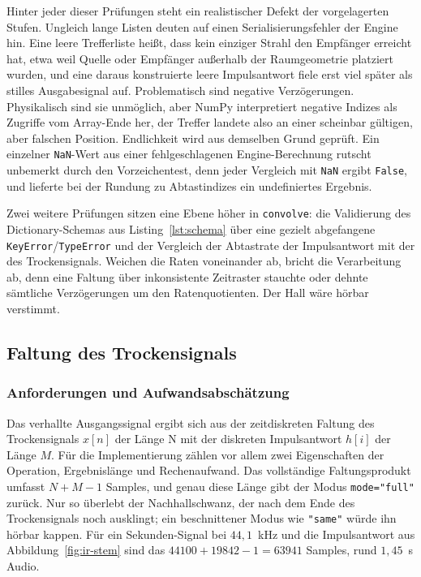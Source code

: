 Hinter jeder dieser Prüfungen steht ein realistischer Defekt der vorgelagerten
Stufen. Ungleich lange Listen deuten auf einen Serialisierungsfehler der Engine
hin. Eine leere Trefferliste heißt, dass kein einziger Strahl den Empfänger
erreicht hat, etwa weil Quelle oder Empfänger außerhalb der Raumgeometrie
platziert wurden, und eine daraus konstruierte leere Impulsantwort fiele erst
viel später als stilles Ausgabesignal auf. Problematisch sind negative Verzögerungen.
Physikalisch sind sie unmöglich, aber NumPy interpretiert negative Indizes
als Zugriffe vom Array-Ende her, der Treffer landete also an einer
scheinbar gültigen, aber falschen Position.
Endlichkeit wird aus demselben Grund geprüft.
Ein einzelner \texttt{NaN}-Wert aus einer fehlgeschlagenen Engine-Berechnung
rutscht unbemerkt durch den Vorzeichentest, denn jeder Vergleich mit
\texttt{NaN} ergibt \texttt{False}, und lieferte bei der Rundung zu
Abtastindizes ein undefiniertes Ergebnis.

Zwei weitere Prüfungen sitzen eine Ebene höher in \texttt{convolve}: die
Validierung des Dictionary-Schemas aus Listing~\ref{lst:schema} über eine
gezielt abgefangene \texttt{KeyError}/\texttt{TypeError} und der Vergleich der
Abtastrate der Impulsantwort mit der des Trockensignals. Weichen die Raten
voneinander ab, bricht die Verarbeitung ab, denn eine Faltung über
inkonsistente Zeitraster stauchte oder dehnte sämtliche Verzögerungen um den
Ratenquotienten. Der Hall wäre hörbar verstimmt.

\subsection{Faltung des Trockensignals}
\label{subsec:faltung}

\subsubsection{Anforderungen und Aufwandsabschätzung}
\label{subsubsec:aufwand}


Das verhallte Ausgangssignal ergibt sich aus der zeitdiskreten Faltung des
Trockensignals $x[n]$ der Länge N mit der diskreten Impulsantwort $h[i]$ der Länge $M$.
Für die Implementierung zählen vor allem zwei Eigenschaften der Operation,
Ergebnislänge und Rechenaufwand. Das vollständige Faltungsprodukt umfasst
$N + M - 1$ Samples, und genau diese Länge gibt der Modus \texttt{mode="full"}
zurück. Nur so überlebt der Nachhallschwanz, der nach dem Ende des
Trockensignals noch ausklingt; ein beschnittener Modus wie \texttt{"same"}
würde ihn hörbar kappen. Für ein Sekunden-Signal bei $44{,}1$~kHz und die
Impulsantwort aus Abbildung~\ref{fig:ir-stem} sind das
$44100 + 19842 - 1 = 63941$ Samples, rund $1{,}45$~s Audio.

